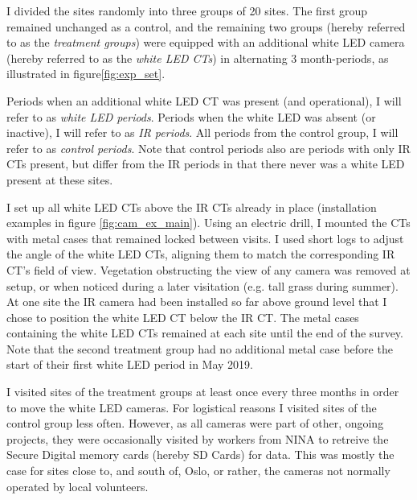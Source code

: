 I divided the sites randomly into three groups of 20 sites.
The first group remained unchanged as a control, and the remaining two groups (hereby referred to as the \emph{treatment groups}) were equipped with an additional white LED camera (hereby referred to as the \emph{white LED CTs}) in alternating 3 month-periods, as illustrated in figure\vref{fig:exp_set}.

Periods when an additional white LED CT was present (and operational), I will refer to as \emph{white LED periods}.
Periods when the white LED was absent (or inactive), I will refer to as \emph{IR periods}.
All periods from the control group, I will refer to as \emph{control periods}.
Note that control periods also are periods with only IR CTs present, but differ from the IR periods in that there never was a white LED present at these sites.

I set up all white LED CTs above the IR CTs already in place (installation examples in figure \ref{fig:cam_ex_main}).
Using an electric drill, I mounted the CTs with metal cases that remained locked between visits.
I used short logs to adjust the angle of the white LED CTs, aligning them to match the corresponding IR CT's field of view.
Vegetation obstructing the view of any camera was removed at setup, or when noticed during a later visitation (e.g. tall grass during summer).
At one site the IR camera had been installed so far above ground level that I chose to position the white LED CT below the IR CT. %
The metal cases containing the white LED CTs remained at each site until the end of the survey. Note that the second treatment group had no additional metal case before the start of their first white LED period in May 2019.






I visited sites of the treatment groups at least once every three months in order to move the white LED cameras.
For logistical reasons I visited sites of the control group less often.
However, as all cameras were part of other, ongoing projects, they were occasionally visited by workers from NINA to retreive the Secure Digital memory cards (hereby SD Cards) for data. %
This was mostly the case for sites close to, and south of, Oslo, or rather, the cameras not normally operated by local volunteers.








